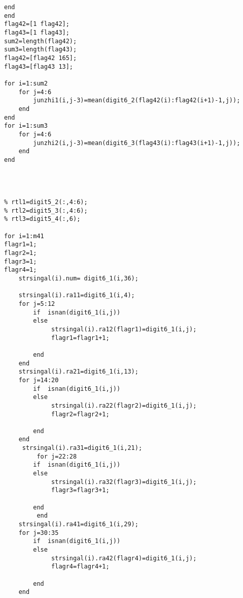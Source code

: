 \begin{appendix}
\begin{lstlisting}[caption=synthesize.m]
    end
end
flag42=[1 flag42];
flag43=[1 flag43];
sum2=length(flag42);
sum3=length(flag43);
flag42=[flag42 165];
flag43=[flag43 13];

for i=1:sum2
    for j=4:6
        junzhi1(i,j-3)=mean(digit6_2(flag42(i):flag42(i+1)-1,j));
    end
end
for i=1:sum3
    for j=4:6
        junzhi2(i,j-3)=mean(digit6_3(flag43(i):flag43(i+1)-1,j));
    end
end




% rtl1=digit5_2(:,4:6);
% rtl2=digit5_3(:,4:6);
% rtl3=digit5_4(:,6);

for i=1:m41
flagr1=1;
flagr2=1;
flagr3=1;
flagr4=1;
    strsingal(i).num= digit6_1(i,36);

    strsingal(i).ra11=digit6_1(i,4);
    for j=5:12
        if  isnan(digit6_1(i,j))
        else
             strsingal(i).ra12(flagr1)=digit6_1(i,j);
             flagr1=flagr1+1;
             
        end
    end
    strsingal(i).ra21=digit6_1(i,13);
    for j=14:20
        if  isnan(digit6_1(i,j))
        else
             strsingal(i).ra22(flagr2)=digit6_1(i,j);
             flagr2=flagr2+1;
             
        end
    end
     strsingal(i).ra31=digit6_1(i,21);
         for j=22:28
        if  isnan(digit6_1(i,j))
        else
             strsingal(i).ra32(flagr3)=digit6_1(i,j);
             flagr3=flagr3+1;
             
        end
         end
    strsingal(i).ra41=digit6_1(i,29);
    for j=30:35
        if  isnan(digit6_1(i,j))
        else
             strsingal(i).ra42(flagr4)=digit6_1(i,j);
             flagr4=flagr4+1;
             
        end
    end
    

\end{lstlisting}
\end{appendix}
